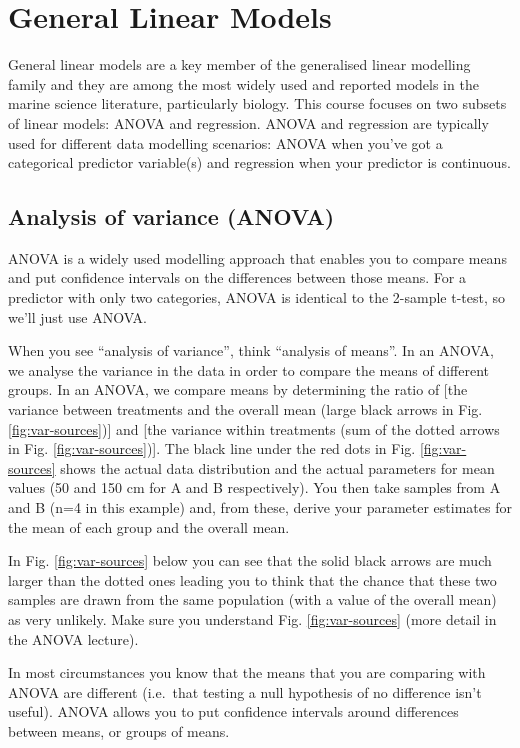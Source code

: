 \documentclass[
  11pt,
  a4paper,
]{book}
\begin{document}
\hypertarget{glm}{%
\chapter{General Linear Models}\label{glm}}

General linear models are a key member of the generalised linear modelling family and they are among the most widely used and reported models in the marine science literature, particularly biology. This course focuses on two subsets of linear models: ANOVA and regression. ANOVA and regression are typically used for different data modelling scenarios: ANOVA when you've got a categorical predictor variable(s) and regression when your predictor is continuous.

\hypertarget{analysis-of-variance-anova}{%
\section{Analysis of variance (ANOVA)}\label{analysis-of-variance-anova}}

ANOVA is a widely used modelling approach that enables you to compare means and put confidence intervals on the differences between those means. For a predictor with only two categories, ANOVA is identical to the 2-sample t-test, so we'll just use ANOVA.

When you see ``analysis of variance'', think ``analysis of means''. In an ANOVA, we analyse the variance in the data in order to compare the means of different groups. In an ANOVA, we compare means by determining the ratio of {[}the variance between treatments and the overall mean (large black arrows in Fig. \ref{fig:var-sources}){]} and {[}the variance within treatments (sum of the dotted arrows in Fig. \ref{fig:var-sources}){]}. The black line under the red dots in Fig. \ref{fig:var-sources} shows the actual data distribution and the actual parameters for mean values (50 and 150 cm for A and B respectively). You then take samples from A and B (n=4 in this example) and, from these, derive your parameter estimates for the mean of each group and the overall mean.

In Fig. \ref{fig:var-sources} below you can see that the solid black arrows are much larger than the dotted ones leading you to think that the chance that these two samples are drawn from the same population (with a value of the overall mean) as very unlikely. Make sure you understand Fig. \ref{fig:var-sources} (more detail in the ANOVA lecture).

In most circumstances you know that the means that you are comparing with ANOVA are different (i.e.~that testing a null hypothesis of no difference isn't useful). ANOVA allows you to put confidence intervals around differences between means, or groups of means.
\end{document}
